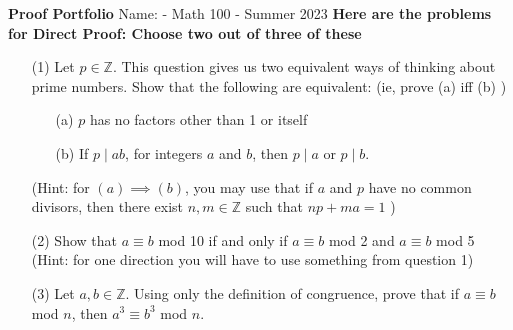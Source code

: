 \documentclass[answers,12pt]{exam}
\newcommand{\br}{\hfill \break}
\newcommand{\Z}{\mathbb{Z}}
\newcommand{\bs}{\begin{solution}}
\newcommand{\es}{\end{solution}}
\begin{document}
\br
\textbf{Proof Portfolio}
\br
Name: - Math 100 - Summer 2023
\br\br
\textbf{Here are the problems for Direct Proof: Choose two out of three of these} %
\begin{enumerate}
    \item [(1)] Let \(p \in \Z\). This question gives us two equivalent ways of thinking about prime numbers. Show that the following are equivalent: (ie, prove (a) iff (b) ) \begin{enumerate}
        \item [(a)] \(p\) has no factors other than 1 or itself 
        \item [(b)] If \(p \mid ab\), for integers \(a\) and \(b\), then \(p \mid a\) or \(p \mid b\). 
    \end{enumerate} (Hint: for \((a) \implies (b)\), you may use that if \(a\) and \(p\) have no common divisors, then there exist \(n, m \in \Z\) such that \(np + ma = 1\) )
    \bs
    \es
    
    \item [(2)] Show that \(a \equiv b \) mod 10 if and only if \(a \equiv b \) mod 2 and \(a \equiv b \) mod 5 (Hint: for one direction you will have to use something from question 1)
    \bs
    \es
    
    
    \item [(3)] Let \(a, b \in \Z\). Using only the definition of congruence, prove that if \(a \equiv b \) mod \(n\), then \(a^3 \equiv b^3 \) mod \(n\). 
    \bs
    \es
\end{enumerate}
\end{document}

